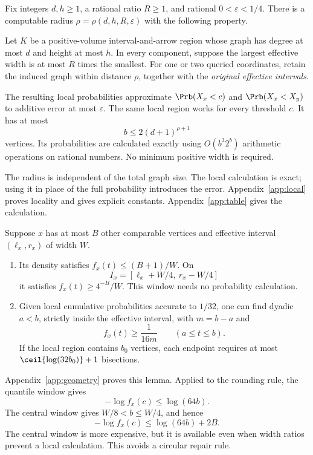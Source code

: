 \begin{theorem}\label{thm:local}
Fix integers \(d,h\ge1\), a rational ratio \(R\ge1\), and rational \(0<\varepsilon<1/4\). There is a computable radius \(\rho=\rho(d,h,R,\varepsilon)\) with the following property.

Let \(K\) be a positive-volume interval-and-arrow region whose graph has degree at most \(d\) and height at most \(h\). In every component, suppose the largest effective width is at most \(R\) times the smallest. For one or two queried coordinates, retain the induced graph within distance \(\rho\), together with the \emph{original effective intervals}.

The resulting local probabilities approximate \(\Prb(X_x<c)\) and \(\Prb(X_x<X_y)\) to additive error at most \(\varepsilon\). The same local region works for every threshold \(c\). It has at most
\[
b\le2(d+1)^{\rho+1}
\]
vertices. Its probabilities are calculated exactly using \(O(b^3 2^b)\) arithmetic operations on rational numbers. No minimum positive width is required.
\end{theorem}

The radius is independent of the total graph size. The local calculation is exact; using it in place of the full probability introduces the error. Appendix~\ref{app:local} proves locality and gives explicit constants. Appendix~\ref{app:table} gives the calculation.

\begin{lemma}\label{lem:windows}
Suppose \(x\) has at most \(B\) other comparable vertices and effective interval \((\ell_x,r_x)\) of width \(W\).
\begin{enumerate}
\item Its density satisfies \(f_x(t)\le(B+1)/W\). On
\[
I_x=[\ell_x+W/4,\ r_x-W/4]
\]
it satisfies \(f_x(t)\ge4^{-B}/W\). This window needs no probability calculation.
\item Given local cumulative probabilities accurate to \(1/32\), one can find dyadic \(a<b\), strictly inside the effective interval, with \(m=b-a\) and
\[
f_x(t)\ge\frac1{16m}\qquad(a\le t\le b).
\]
If the local region contains \(b_0\) vertices, each endpoint requires at most \(\ceil{\log(32b_0)}+1\) bisections.
\end{enumerate}
\end{lemma}

Appendix~\ref{app:geometry} proves this lemma. Applied to the rounding rule, the quantile window gives
\[
-\log f_x(c)\le\log(64b).
\]
The central window gives \(W/8<b\le W/4\), and hence
\[
-\log f_x(c)\le\log(64b)+2B.
\]
The central window is more expensive, but it is available even when width ratios prevent a local calculation. This avoids a circular repair rule.

